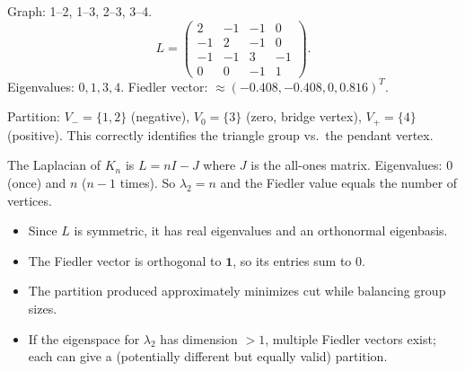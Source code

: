 \begin{example}
Graph: 1--2, 1--3, 2--3, 3--4.
\[
L=\begin{pmatrix}2&-1&-1&0\\-1&2&-1&0\\-1&-1&3&-1\\0&0&-1&1\end{pmatrix}.
\]
Eigenvalues: $0,1,3,4$. Fiedler vector: $\approx(-0.408,-0.408,0,0.816)^T$.

Partition: $V_-=\{1,2\}$ (negative), $V_0=\{3\}$ (zero, bridge vertex), $V_+=\{4\}$ (positive). This correctly identifies the triangle group vs.\ the pendant vertex.
\end{example}

\begin{example}
The Laplacian of $K_n$ is $L=nI-J$ where $J$ is the all-ones matrix. Eigenvalues: $0$ (once) and $n$ ($n-1$ times). So $\lambda_2=n$ and the Fiedler value equals the number of vertices.
\end{example}

\begin{remark}
\begin{itemize}
  \item Since $L$ is symmetric, it has real eigenvalues and an orthonormal eigenbasis.
  \item The Fiedler vector is orthogonal to $\mathbf{1}$, so its entries sum to 0.
  \item The partition produced approximately minimizes cut while balancing group sizes.
  \item If the eigenspace for $\lambda_2$ has dimension $>1$, multiple Fiedler vectors exist; each can give a (potentially different but equally valid) partition.
\end{itemize}
\end{remark}
